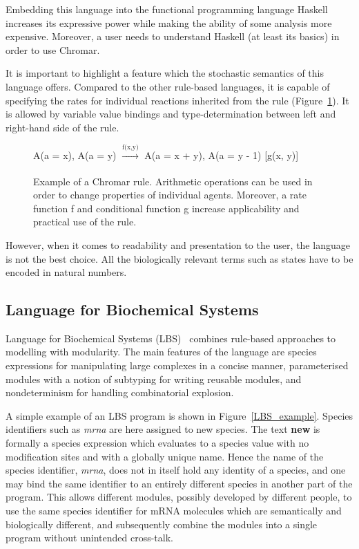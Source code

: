 \documentclass[11pt,a4paper]{report}
\begin{document}
Embedding this language into the functional programming language Haskell increases its expressive power while making the ability of some analysis more expensive. Moreover, a user needs to understand Haskell (at least its basics) in order to use Chromar.

It is important to highlight a feature which the stochastic semantics of this language offers. Compared to the other rule-based languages, it is capable of specifying the rates for individual reactions inherited from the rule (Figure~\ref{chromar_rule}). It is allowed by variable value bindings and type-determination between left and right-hand side of the rule.

\begin{figure}[!h]
\begin{center}
A(a = x), A(a = y) $\xrightarrow[]{\text{f(x,y)}}$ A(a = x + y), A(a = y - 1) [g(x, y)]
\end{center}
\caption{Example of a Chromar rule. Arithmetic operations can be used in order to change properties of individual agents. Moreover, a rate function f and conditional function g increase applicability and practical use of the rule.}\label{chromar-rule}\label{chromar_rule}
\end{figure}

However, when it comes to readability and presentation to the user, the language is not the best choice. All the biologically relevant terms such as states have to be encoded in natural numbers.

\subsection{Language for Biochemical Systems}

Language for Biochemical Systems (LBS)~\cite{Pedersen} combines rule-based approaches to modelling with modularity. The main features of the language are species expressions for manipulating large complexes in a concise manner, parameterised modules with a notion of subtyping for writing reusable modules, and nondeterminism for handling combinatorial explosion.

A simple example of an LBS program is shown in Figure~\ref{LBS_example}. Species identifiers such as \emph{mrna} are here assigned to new species. The text \textbf{new{}} is formally a species expression which evaluates to a species value with no modification sites and with a globally unique name. Hence the name of the species identifier, \emph{mrna}, does not in itself hold any identity of a species, and one may bind the same identifier to an entirely different species in another part of the program. This allows different modules, possibly developed by different people, to use the same species identifier for mRNA molecules which are semantically and biologically different, and subsequently combine the modules into a single program without unintended cross-talk.
\end{document}
